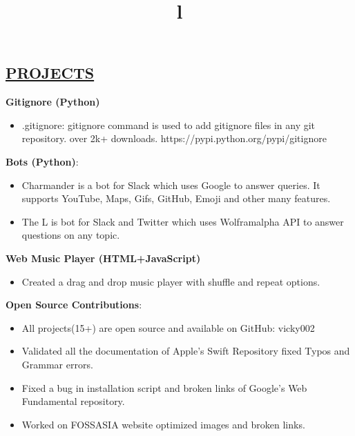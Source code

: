 \documentclass[margin]{res}
\begin{document}
\begin{resume}
\section{\underline{PROJECTS}}
\textbf{Gitignore (Python)}
\begin{itemize}
\setlength{\itemsep}{0pt}
\item .gitignore: gitignore command is used to add gitignore files in any git repository. over 2k+ downloads. {https://pypi.python.org/pypi/gitignore} \end{itemize}
\vspace{-3mm}
\textbf{Bots (Python)}:
\begin{itemize}
\item Charmander is a bot for Slack which uses Google to answer queries. It supports YouTube, Maps, Gifs, GitHub, Emoji and other many features. 
\item The L is bot for Slack and Twitter which uses Wolframalpha API to answer questions on any topic.
\end{itemize}
\vspace{-3mm}
\textbf{Web Music Player (HTML+JavaScript)}
\begin{itemize}
\setlength{\itemsep}{0pt}
\item Created a drag and drop music player with shuffle and repeat options.
\end{itemize}
\vspace{-3mm}
\textbf{Open Source Contributions}:
\begin{itemize}
\setlength{\itemsep}{0pt}
\item All projects(15+) are open source and available on GitHub: vicky002
\item Validated all the documentation of Apple's Swift Repository fixed Typos and Grammar errors.
\item Fixed a bug in installation script and broken links of Google's Web Fundamental repository.
\item Worked on FOSSASIA website optimized images and broken links.
\end{itemize}



\begin{format}
\title{l}\\
\\
\body\\
\end{format}
\vspace{-5mm}

\end{resume}
\end{document}
